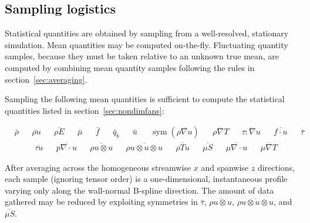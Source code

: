\documentclass[letterpaper,11pt,nointlimits,reqno,draft]{amsart}
\newcommand{\symmetricpart}[1]
  {\ensuremath{\operatorname{sym}\left(#1\right)}}
\begin{document}
\subsection{Sampling logistics}

Statistical quantities are obtained by sampling from a well-resolved,
stationary simulation.  Mean quantities may be computed on-the-fly.
Fluctuating quantity samples, because they must be taken relative to an unknown
true mean, are computed by combining mean quantity samples following the rules
in section~\ref{sec:averaging}.

Sampling the following mean quantities is sufficient to compute
the statistical quantities listed in section~\ref{sec:nondimfans}:
\begin{samepage}
\begin{align}
&\bar{\rho}
&
&\overline{\rho{}u}
&
&\overline{\rho{}E}
&
&\bar{\mu}
&
&\bar{f}
&
&\bar{q}_b
&
&\bar{u}
&
&\symmetricpart{\overline{\rho\nabla{}u}}
&
&\overline{\rho\nabla{}T}
&
&\overline{\tau:\nabla{}u}
&
&\overline{f\cdot{}u}
&
&\bar{\tau}
\end{align}
\begin{align}
&\overline{\tau{}u}
&
&\overline{p\nabla\cdot{}u}
&
&\overline{\rho{}u\otimes{}u}
&
&\overline{\rho{}u\otimes{}u\otimes{}u}
&
&\overline{\rho{}Tu}
&
&\overline{\mu{}S}
&
&\overline{\mu\nabla\cdot{}u}
&
&\overline{\mu\nabla{}T}
\end{align}
\end{samepage}
After averaging across the homogeneous streamwise $x$ and spanwise $z$
directions, each sample (ignoring tensor order) is a one-dimensional,
instantaneous profile varying only along the wall-normal B-spline direction.
The amount of data gathered may be reduced by exploiting symmetries in
$\bar{\tau}$, $\overline{\rho{}u\otimes{}u}$,
$\overline{\rho{}u\otimes{}u\otimes{}u}$, and $\overline{\mu{}S}$.
\end{document}
